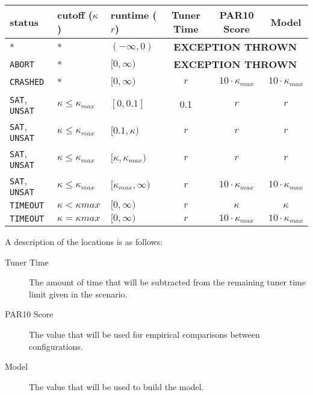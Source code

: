 \documentclass[manual.tex]{subfiles}
\begin{document}
\begin{center}
\begin{tabular}{|l | l | l  ||  c | c | c |}
\hline
\textbf{status} & \textbf{cutoff} ($\kappa$) & \textbf{runtime} ($r$) & Tuner Time & PAR10 Score & Model \\
\hline
\hline
* & *  & $(-\infty, 0)$ & \multicolumn{3}{c|}{\textbf{EXCEPTION THROWN}} \\ %
\hline
\texttt{ABORT} &  *  & $[0, \infty)$  & \multicolumn{3}{c|}{\textbf{EXCEPTION THROWN}} \\ %
\hline
\texttt{CRASHED} & *  & $[0, \infty)$ & $r$ & $10\cdot\kappa_{max}$ & $10\cdot\kappa_{max}$ \\ %
\hline
{\texttt{SAT}, \texttt{UNSAT}} & $\kappa\leq\kappa_{max}$  & $[0,0.1]$ & 0.1 & $r$ & $r$ \\ %
\hline
{\texttt{SAT}, \texttt{UNSAT}} & $\kappa\leq\kappa_{max}$ & $[0.1,\kappa)$ & $r$ & $r$ & $r$ \\ %
\hline
{\texttt{SAT}, \texttt{UNSAT}} & $\kappa\leq\kappa_{max}$ & $[\kappa, \kappa_{max})$ & $r$ & $r$ & $r$ \\ %
\hline
{\texttt{SAT}, \texttt{UNSAT}} & $\kappa\leq\kappa_{max}$ & $[\kappa_{max},\infty)$ & $r$  & $10\cdot\kappa_{max}$ & $10\cdot\kappa_{max}$ \\ %

\hline
{\texttt{TIMEOUT}} & $\kappa<\kappa{max}$ & $[0,\infty)$ & $r$ & $\kappa$ & $\kappa$ \\ %
\hline
{\texttt{TIMEOUT}} & $\kappa=\kappa{max}$ & $[0,\infty)$ & $r$  & $10\cdot\kappa_{max}$ & $10\cdot\kappa_{max}$\\
\hline
\end{tabular}
\end{center}

A description of the locations is as follows:

\begin{description}
\item[Tuner Time] The amount of time that will be subtracted from the remaining tuner time limit given in the scenario.
\item[PAR10 Score] The value that will be used for empirical comparisons between configurations.
\item[Model] 	The value that will be used to build the model.
\end{description}
\end{document}
